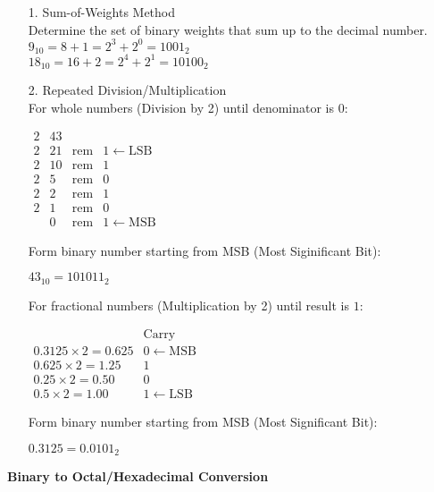 \documentclass[10pt, twocolumn]{article}
\begin{document}
\begin{enumerate}
\item[1.]{Sum-of-Weights Method} \\
Determine the set of binary weights that sum up to the decimal number.
\newline
$9_{10} = 8+1 = 2^3+2^0 = 1001_2$ \\
$18_{10} = 16+2 = 2^4+2^1 = 10100_2$
\item[2.]{Repeated Division/Multiplication} \\
For whole numbers (Division by 2) until denominator is $0$:
\begin{center}
$\begin{array}{c|lll}
2 & 43 &\\
2 & 21 & \text{rem} & 1 \leftarrow \text{LSB} \\
2 & 10 & \text{rem} & 1 \\
2 & 5 & \text{rem} & 0 \\
2 & 2 & \text{rem} & 1 \\
2 & 1 & \text{rem} & 0 \\
  & 0 & \text{rem} & 1 \leftarrow \text{MSB}
\end{array}$
\end{center}
Form binary number starting from MSB (Most Siginificant Bit):
\begin{center}
$43_{10} = 101011_2$
\end{center}
For fractional numbers (Multiplication by 2) until result is $1$:
\begin{center}
$\begin{array}{l|l}
 & \text{Carry} \\ \hline
0.3125\times 2=0.625 & 0 \leftarrow \text{MSB} \\
0.625\times 2=1.25 & 1 \\
0.25\times 2=0.50 & 0 \\
0.5\times 2=1.00 & 1 \leftarrow \text{LSB}
\end{array}$
\end{center}
Form binary number starting from MSB (Most Significant Bit):
\begin{center}
$0.3125 = 0.0101_2$
\end{center}
\end{enumerate}
{\bf Binary to Octal/Hexadecimal Conversion}
\end{document}
